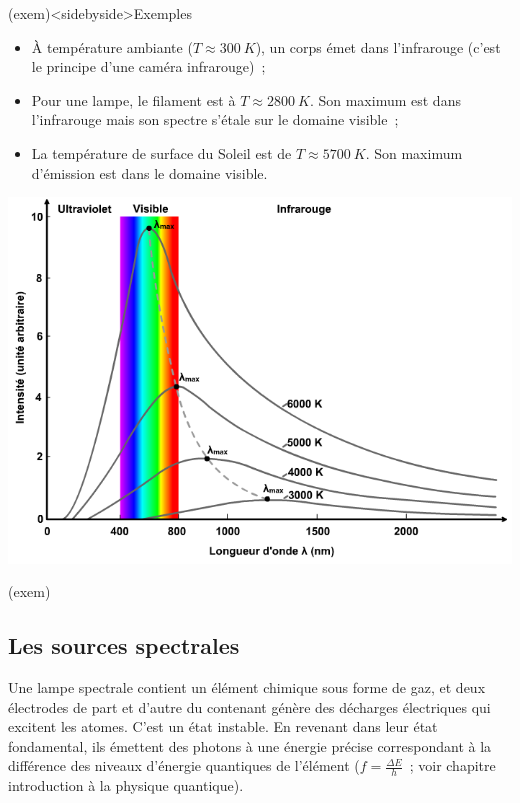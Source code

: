 \documentclass[../../main/main.tex]{subfiles}
\begin{document}
\begin{tcb}(exem)<sidebyside>{Exemples}
	\begin{itemize}
		\item À température ambiante ($T \approx \SI{300}{K}$), un corps émet
		      dans l'infrarouge (c'est le principe d'une caméra infrarouge)~;
		\item Pour une lampe, le filament est à $T \approx \SI{2800}{K}$. Son
		      maximum est dans l'infrarouge mais son spectre s'étale sur le
		      domaine visible~;
		\item La température de surface du Soleil est de $T \approx
			      \SI{5700}{K}$. Son maximum d'émission est dans le domaine visible.
	\end{itemize}
	\tcblower
	\begin{center}
		\includegraphics[width=\linewidth]{ch1_fig2.png}
		\label{fig:cps_chaud}
	\end{center}
\end{tcb}(exem)

\subsection{Les sources spectrales}

Une lampe spectrale contient un élément chimique sous forme de gaz, et deux
électrodes de part et d'autre du contenant génère des décharges électriques qui
excitent les atomes. C'est un état instable. En revenant dans leur état
fondamental, ils émettent des photons à une énergie précise correspondant à la
différence des niveaux d'énergie quantiques de l'élément ($f = \frac{\Delta
		E}{h}$~; voir chapitre introduction à la physique quantique).
\end{document}
